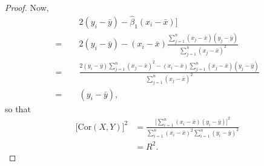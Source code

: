 \begin{proof}
    Now,
    \begin{equation*}
        \begin{split}
            \qquad &2(y_i - \bar{y}) - \hat{\beta}_1(x_i - \bar{x})] \\
            = \, &2(y_i - \bar{y}) - (x_i - \bar{x})
                \frac{\sum_{j=1}^{n}(x_j - \bar{x})(y_j - \bar{y})}
                {\sum_{j=1}^{n}{(x_j - \bar{x})}^{2}} \\
            = \, &\frac{2(y_i - \bar{y})\sum_{j=1}^{n}{(x_j - \bar{x})}^{2} 
                - (x_i - \bar{x})\sum_{j=1}^{n}(x_j - \bar{x})(y_j - \bar{y})}
                {\sum_{j=1}^{n}{(x_j - \bar{x})}^{2}} \\    %
            = \, &(y_i - \bar{y}),
        \end{split}
    \end{equation*}
    so that
    \begin{equation*}
        \begin{split}
            {\bigl[\text{Cor}(X, Y)\bigr]}^{2} 
            &= \frac{{\bigl[\sum_{i=1}^{n}(x_i - \bar{x})(y_i - \bar{y})\bigr]}^{2}}
            {\sum_{i=1}^{n}{(x_i - \bar{x})}^{2}\sum_{i=1}^{n}{(y_i - \bar{y})}^{2}} \\
            &= R^2.
        \end{split}
    \end{equation*}
\end{proof}
